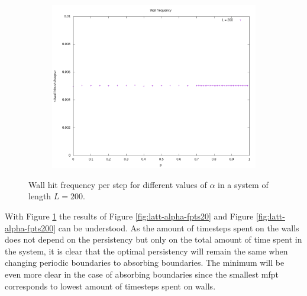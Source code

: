 \documentclass[]{scrartcl}
\begin{document}
\begin{figure}[!hbt]
\begin{subfigure}{0.45\textwidth}
\end{subfigure}
\begin{subfigure}{0.45\textwidth}
 \includegraphics[width=\textwidth]{./fig/latt/alpha/wallFreq/WF-alpha=1-rel.png}
\end{subfigure}
\caption{Wall hit frequency per step for different values of $\alpha$ in a system of length $L = 200$.} 
\label{fig:latt-alpha-wallFreq}
\end{figure}

With Figure \ref{fig:latt-alpha-wallFreq} the results of Figure \ref{fig:latt-alpha-fpts20} and Figure \ref{fig:latt-alpha-fpts200} can be understood. As the amount of timesteps spent on the walls does not depend on the persistency but only on the total amount of time spent in the system, it is clear that the optimal persistency will remain the same when changing periodic boundaries to absorbing boundaries. The minimum will be even more clear in the case of absorbing boundaries since the smallest mfpt corresponds to lowest amount of timesteps spent on walls.

 
\end{document}

